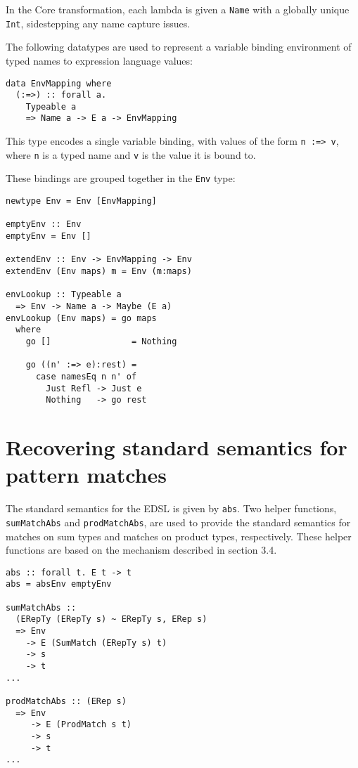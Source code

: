 \documentclass[sigplan,anonymous,review]{acmart}
\newcommand{\ttt}{\texttt}
\begin{document}
In the Core transformation, each lambda is given a \ttt{Name} with a globally
unique \ttt{Int}, sidestepping any name capture issues.

The following datatypes are used to represent a variable binding environment
of typed names to expression language values:

\begin{lstlisting}
data EnvMapping where
  (:=>) :: forall a.
    Typeable a
    => Name a -> E a -> EnvMapping
\end{lstlisting}

This type encodes a single variable binding, with values of the form
\ttt{n :=> v}, where \ttt{n} is a typed name and \ttt{v} is the value it is bound to.

These bindings are grouped together in the \ttt{Env} type:

\begin{lstlisting}
newtype Env = Env [EnvMapping]

emptyEnv :: Env
emptyEnv = Env []

extendEnv :: Env -> EnvMapping -> Env
extendEnv (Env maps) m = Env (m:maps)

envLookup :: Typeable a
  => Env -> Name a -> Maybe (E a)
envLookup (Env maps) = go maps
  where
    go []                = Nothing

    go ((n' :=> e):rest) =
      case namesEq n n' of
        Just Refl -> Just e
        Nothing   -> go rest
\end{lstlisting}


\section{Recovering standard semantics for pattern matches}

The standard semantics for the EDSL is given by \ttt{abs}. Two helper
functions, \ttt{sumMatchAbs} and \ttt{prodMatchAbs}, are used to provide
the standard semantics for matches on sum types and matches on product
types, respectively. These helper functions are based on the mechanism
described in section 3.4.

\begin{lstlisting}
abs :: forall t. E t -> t
abs = absEnv emptyEnv

sumMatchAbs ::
  (ERepTy (ERepTy s) ~ ERepTy s, ERep s)
  => Env
    -> E (SumMatch (ERepTy s) t)
    -> s
    -> t
...

prodMatchAbs :: (ERep s)
  => Env
     -> E (ProdMatch s t)
     -> s
     -> t
...
\end{lstlisting}
\end{document}
